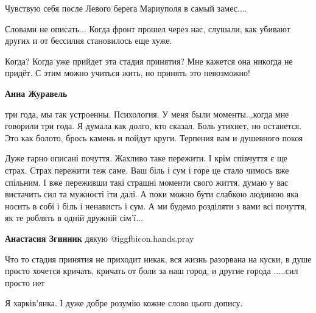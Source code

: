  
 
 
 
 
\qqSecCmt

\begin{itemize} %

Чувствую себя после Левого берега Мариуполя в самый замес....

Словами не описать... Когда фронт прошел через нас, слушали, как убивают других
и от бессилия становилось еще хуже.


Когда? Когда уже прийдет эта стадия принятия? Мне кажется она никогда не
придёт. С этим можно учиться жить, но принять это невозможно!

\begin{itemize} %
\textbf{Анна Журавель} 

три года, мы так устроенны. Психология. У меня были моменты..,когда мне
говорили три года. Я думала как долго, кто сказал. Боль утихнет, но останется.
Это как болото, брось камень и пойдут круги. Терпения вам и душевного покоя

\end{itemize} %


Дуже гарно описані почуття. Жахливо таке пережити. І крім співчуття є ще страх.
Страх пережити теж саме. Ваш біль і сум і горе це стало чимось вже спільним. І
вже переживши такі страшні моменти свого життя, думаю у вас вистачить сил та
мужності іти далі. А поки можно бути слабкою людиною яка носить в собі і біль і
ненависть і сум. А ми будемо розділяти з вами всі почуття, як те роблять в
одній дружній сім'ї...

\textbf{Анастасия Згинник} дякую  @igg{fbicon.hands.pray}


Что то стадия принятия не приходит никак, вся жизнь разорвана на куски, в душе
просто хочется кричать, кричать от боли за наш город, и другие города .....сил
просто нет


Я харків'янка. І дуже добре розумію кожне слово цього допису.


\end{itemize}
